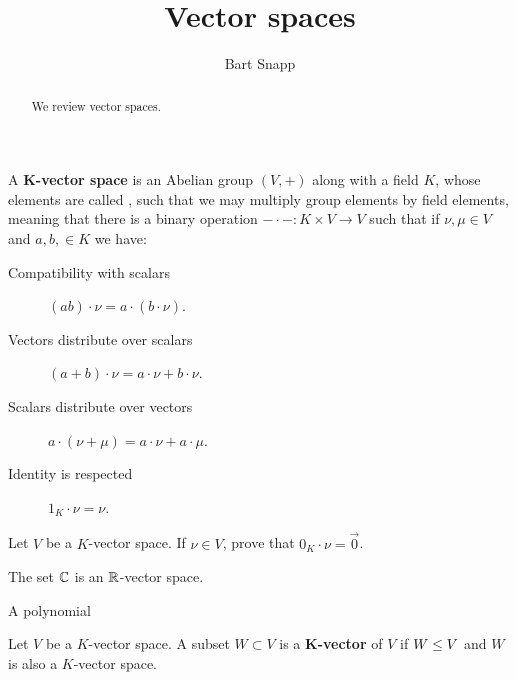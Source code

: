 \documentclass{ximera}
\author{Bart Snapp}
\title{Vector spaces}
\begin{document}
\begin{abstract}
  We review vector spaces.
\end{abstract}
\maketitle



\begin{definition}
  A \textbf{$\boldsymbol{K}$-vector space} is an Abelian group $(V,+)$
  along with a field $K$, whose elements are called ,
  such that we may multiply group elements by field elements, meaning
  that there is a binary operation $-\cdot-: K\times V \to V$ such that
  if $\nu,\mu\in V$ and $a,b,\in K$ we have:
\begin{description}
\item[Compatibility with scalars] $(ab)\cdot \nu = a\cdot (b\cdot \nu)$.
\item[Vectors distribute over scalars] $(a+b)\cdot \nu =
  a\cdot\nu + b\cdot \nu$.
\item[Scalars distribute over vectors] $a\cdot (\nu+\mu) =
  a\cdot \nu + a\cdot \mu$.
\item[Identity is respected] $1_K\cdot \nu = \nu$.
\end{description}
\end{definition}

\begin{exercise}
  Let $V$ be a $K$-vector space. If $\nu\in V$, prove that
  $0_K\cdot \nu = \vec{0}$.
\end{exercise}


\begin{example}
\end{example}



\begin{example}
  The set $\mathbb C$ is an $\mathbb R$-vector space.
\end{example}


\begin{example}
  A polynomial 
\end{example}




\begin{definition}
  Let $V$ be a $K$-vector space. A subset $W\subset V$ is a
  \textbf{$\boldsymbol K$-vector}  of $V$ if $W\leq V$ and $W$
  is also a $K$-vector space.
\end{definition}
\end{document}
